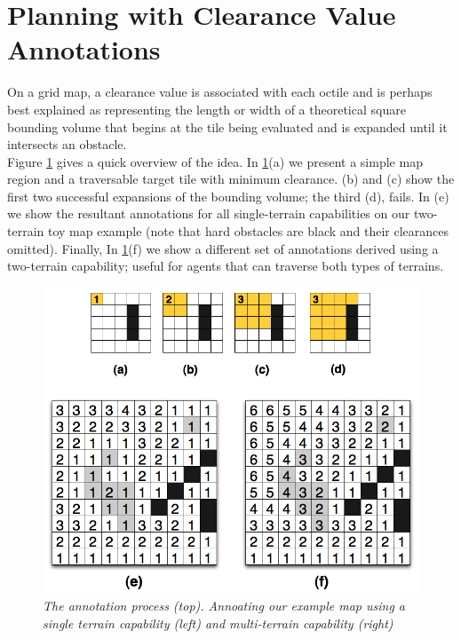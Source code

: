 \section{Planning with Clearance Value Annotations}
\label{aha:planningwithannotations}
On a grid map, a clearance value is associated with each octile and is perhaps best explained as representing the length or width of a theoretical square bounding volume that begins at the tile being evaluated and is expanded until it intersects an obstacle. \\
Figure \ref{aha-fig:annotations} gives a quick overview of the idea. In \ref{aha-fig:annotations}(a) we present a simple map region and a traversable target tile with minimum clearance. (b) and (c) show the first two successful expansions of the bounding volume; the third (d), fails. In (e) we show the resultant annotations for all single-terrain capabilities on our two-terrain toy map example (note that hard obstacles are black and their clearances omitted). Finally, In \ref{aha-fig:annotations}(f) we show a different set of annotations derived using a two-terrain capability; useful for agents that can traverse both types of terrains.

\begin{figure}[htbp]
       \caption{\emph{The annotation process (top). Annoating our example map using a single terrain capability (left)  and multi-terrain capability (right) } }
       \begin{center}
                       \includegraphics[scale=0.25]{diagrams/annotations.png}
       \end{center}
       \label{aha-fig:annotations}
\end{figure}

